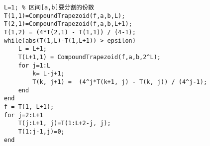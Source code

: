 \documentclass[a4paper]{article}
\begin{document}
\begin{spacing}{1.5}
\begin{CJK*}{GBK}{song}
\begin{scriptsize}
\begin{enumerate}[(1)]
\begin{lstlisting}
L=1; % 区间[a,b]要分割的份数
T(1,1)=CompoundTrapezoid(f,a,b,L);
T(2,1)=CompoundTrapezoid(f,a,b,L+1);
T(1,2) = (4*T(2,1) - T(1,1)) / (4-1);
while(abs(T(1,L)-T(1,L+1)) > epsilon)
    L = L+1;
    T(L+1,1) = CompoundTrapezoid(f,a,b,2^L);
    for j=1:L
        k= L-j+1;
        T(k, j+1) =  (4^j*T(k+1, j) - T(k, j)) / (4^j-1);
    end
end
f = T(1, L+1);
for j=2:L+1
    T(j:L+1, j)=T(1:L+2-j, j);
    T(1:j-1,j)=0;
end
\end{lstlisting}


\end{enumerate}
\end{scriptsize}
\end{CJK*}
\end{spacing}
\end{document}
